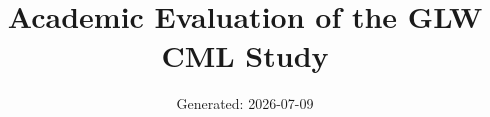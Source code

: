 \documentclass[11pt]{article}
\title{Academic Evaluation of the GLW CML Study}
\author{}
\date{Generated: 2026-07-09}
\begin{document}
\sloppy
\maketitle


\end{document}
